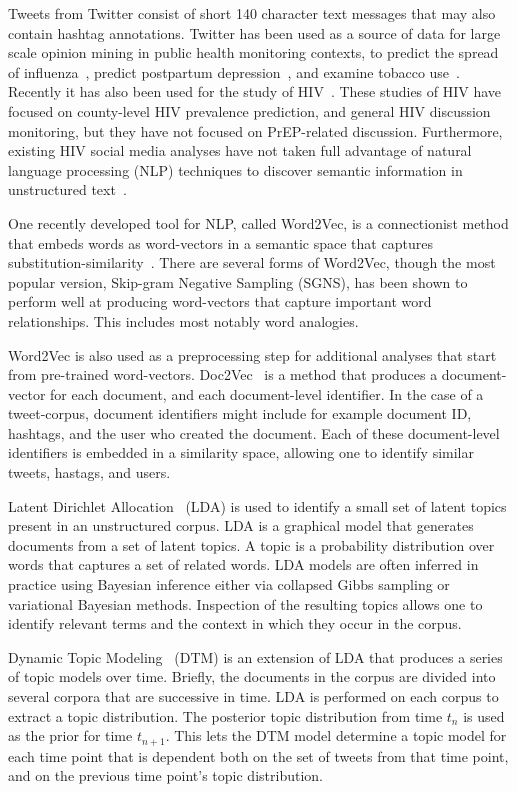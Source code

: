\documentclass{sig-alternate-05-2015}
\begin{document}
Tweets from Twitter consist of short 140 character text messages that may also contain hashtag annotations. Twitter has been used as a source of data for large scale opinion mining in public health monitoring contexts, to predict the spread of influenza~\cite{aramaki2011twitter}, predict postpartum depression~\cite{de2013predicting}, and examine tobacco use~\cite{myslin2013using}. Recently it has also been used for the study of HIV~\cite{young2014methods,young2013online}. These studies of HIV have focused on county-level HIV prevalence prediction, and general HIV discussion monitoring, but they have not focused on PrEP-related discussion. Furthermore, existing HIV social media analyses have not taken full advantage of natural language processing (NLP) techniques to discover semantic information in unstructured text~\cite{young2015big}.

One recently developed tool for NLP, called Word2Vec, is a connectionist method that embeds words as word-vectors in a semantic space that captures substitution-similarity~\cite{mikolov2013efficient}. There are several forms of Word2Vec, though the most popular version, Skip-gram Negative Sampling (SGNS), has been shown to perform well at producing word-vectors that capture important word relationships. This includes most notably word analogies. 

Word2Vec is also used as a preprocessing step for additional analyses that start from pre-trained word-vectors. Doc2Vec~\cite{le2014distributed} is a method that produces a document-vector for each document, and each document-level identifier. In the case of a tweet-corpus, document identifiers might include for example document ID, hashtags, and the user who created the document. Each of these document-level identifiers is embedded in a similarity space, allowing one to identify similar tweets, hastags, and users.

Latent Dirichlet Allocation~\cite{blei2003latent} (LDA) is used to identify a small set of latent topics present in an unstructured corpus. LDA is a graphical model that generates documents from a set of latent topics. A topic is a probability distribution over words that captures a set of related words. LDA models are often inferred in practice using Bayesian inference either via collapsed Gibbs sampling or variational Bayesian methods. Inspection of the resulting topics allows one to identify relevant terms and the context in which they occur in the corpus. 

Dynamic Topic Modeling~\cite{blei2006dynamic} (DTM) is an extension of LDA that produces a series of topic models over time. Briefly, the documents in the corpus are divided into several corpora that are successive in time. LDA is performed on each corpus to extract a topic distribution. The posterior topic distribution from time $t_n$ is used as the prior for time $t_{n+1}$. This lets the DTM model determine a topic model for each time point that is dependent both on the set of tweets from that time point, and on the previous time point's topic distribution.
\end{document}
